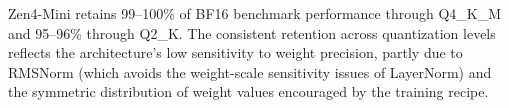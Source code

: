 \documentclass[11pt,a4paper]{article}
\begin{document}
Zen4-Mini retains 99--100\% of BF16 benchmark performance through Q4\_K\_M and 95--96\%
through Q2\_K. The consistent retention across quantization levels reflects the
architecture's low sensitivity to weight precision, partly due to RMSNorm (which avoids
the weight-scale sensitivity issues of LayerNorm) and the symmetric distribution of
weight values encouraged by the training recipe.
\end{document}
